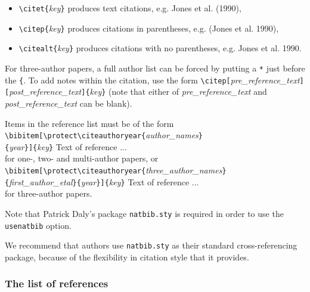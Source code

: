 \documentclass[useAMS,usenatbib]{mn2e}
\begin{document}
  \begin{itemize}
  \item \verb"\citet{"\textit{key}\verb"}" produces text citations,
  e.g. Jones et al. (1990),
  \item \verb"\citep{"\textit{key}\verb"}" produces citations in parentheses,
  e.g. (Jones et al. 1990),
  \item \verb"\citealt{"\textit{key}\verb"}" produces citations with no parentheses,
  e.g. Jones et al. 1990.
  \end{itemize}
For three-author papers, a full author list can be forced by
putting a \verb"*" just before the \verb"{". To add notes within
the citation, use the form
\verb"\citep["\textit{pre\_reference\_text}\verb"]["\textit{post\_reference\_text}\verb"]{"\textit{key}\verb"}"
(note that either of \textit{pre\_reference\_text} and
\textit{post\_reference\_text} can be blank).

Items in the reference list must be of the form\\
\verb"\bibitem[\protect\citeauthoryear{"\textit{author\_names}\verb"}"\\
 \verb"{"\textit{year}\verb"}]{"\textit{key}\verb"}"
Text of reference ...\\
for one-, two- and multi-author papers, or\\
\verb"\bibitem[\protect\citeauthoryear{"\textit{three\_author\_names}\verb"}"\\
 \verb"{"\textit{first\_author\_etal}\verb"}{"\textit{year}\verb"}]{"\textit{key}\verb"}"
Text of reference ...\\
for three-author papers.

Note that Patrick Daly's package \verb"natbib.sty" is required in
order to use the \verb"usenatbib" option.

We recommend that authors use \verb"natbib.sty" as their standard
cross-referencing package, because of the flexibility in citation
style that it provides.


\subsubsection{The list of references}
\end{document}

